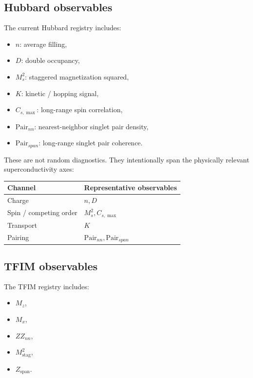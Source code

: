 \documentclass[11pt]{article}
\begin{document}
\subsection{Hubbard observables}

The current Hubbard registry includes:

\begin{itemize}
\item \(n\): average filling,
\item \(D\): double occupancy,
\item \(M_s^2\): staggered magnetization squared,
\item \(K\): kinetic / hopping signal,
\item \(C_{s,\max}\): long-range spin correlation,
\item \(\mathrm{Pair}_{nn}\): nearest-neighbor singlet pair density,
\item \(\mathrm{Pair}_{span}\): long-range singlet pair coherence.
\end{itemize}

These are not random diagnostics. They intentionally span the physically relevant superconductivity axes:

\begin{center}
\begin{tabular}{ll}
\toprule
Channel & Representative observables \\
\midrule
Charge & \(n, D\) \\
Spin / competing order & \(M_s^2, C_{s,\max}\) \\
Transport & \(K\) \\
Pairing & \(\mathrm{Pair}_{nn}, \mathrm{Pair}_{span}\) \\
\bottomrule
\end{tabular}
\end{center}

\subsection{TFIM observables}

The TFIM registry includes:

\begin{itemize}
\item \(M_z\),
\item \(M_x\),
\item \(ZZ_{nn}\),
\item \(M_{\mathrm{stag}}^2\),
\item \(Z_{\mathrm{span}}\).
\end{itemize}
\end{document}
